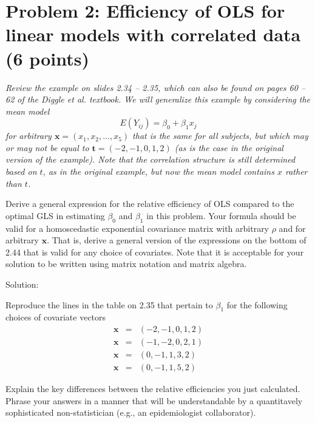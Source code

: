 \documentclass[11pt, letterpaper]{article}
\newcommand{\bx}{{\bm x}}
\newcommand{\beas}{\begin{eqnarray*}}
\newcommand{\eeas}{\end{eqnarray*}}
\begin{document}
\section*{Problem 2: Efficiency of OLS for linear models with correlated data (6 points)}
{\em Review the example on slides 2.34 -- 2.35, which can also be found on pages 60 -- 62 of the Diggle et al. textbook.  We will generalize this example by considering the mean model
\[
E(Y_{ij}) = \beta_0 + \beta_1 x_j
\]
for arbitrary $\bx = (x_1,x_2,\ldots,x_5)$ that is the same for all subjects, but which may or may not
be equal to ${\bm t}=(-2,-1,0,1,2)$ (as is the case in the original version of the example).
Note that the correlation structure is still determined based on $t$, as in the original example, but now the mean model contains $x$ rather than $t$.}
\begin{enumerate}[(a)]
{\em \item Derive a general expression for the relative efficiency of OLS compared to the optimal GLS in estimating $\beta_0$ and $\beta_1$ in this problem.  Your formula should be valid for a homoscedastic exponential covariance matrix with arbitrary
$\rho$ and for arbitrary $\bx$.  That is, derive a general version of the expressions
on the bottom of 2.44 that is valid for any choice of covariates.  Note that it is acceptable for your solution to be written using matrix notation and matrix algebra.}

\begin{description}
\item[Solution:] 
\end{description}
{\em \item Reproduce the lines in the table on 2.35 that pertain to $\beta_1$ for the following choices of covariate vectors
\beas
\bx&=&(-2,-1,0,1,2)\\
\bx&=&(-1,-2,0,2,1)\\
\bx&=&(0,-1,1,3,2)\\
\bx&=&(0,-1,1,5,2)
\eeas}
{\em \item Explain the key differences between the relative efficiencies you just calculated.  Phrase your answers in a manner that will be understandable by
a quantitavely sophisticated non-statistician (e.g., an epidemiologist collaborator).
}
\end{enumerate} 
\end{document}
